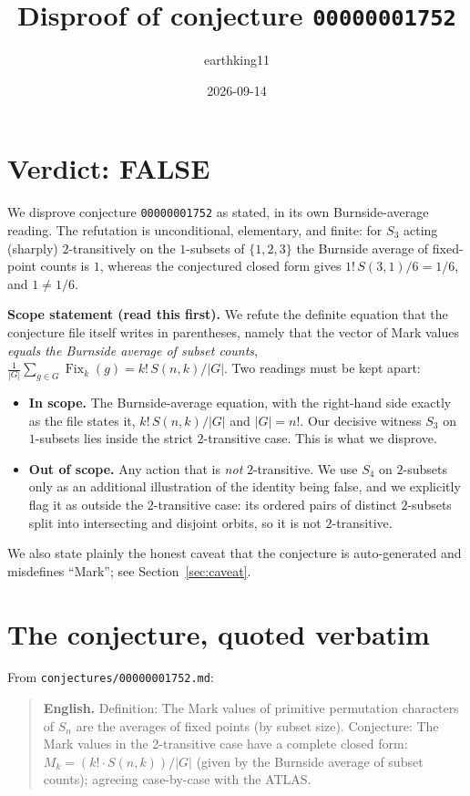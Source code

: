 \documentclass[11pt]{article}
\title{Disproof of conjecture \texttt{00000001752}}
\author{earthking11}
\date{2026-09-14}
\theoremstyle{definition}
\theoremstyle{remark}
\newcommand{\Sthree}{S_3}
\newcommand{\Fix}{\operatorname{Fix}}
\newcommand{\Stir}[2]{S(#1,#2)}
\begin{document}
\maketitle

\section*{Verdict: FALSE}

We disprove conjecture \texttt{00000001752} as stated, in its own
Burnside-average reading. The refutation is unconditional, elementary, and
finite: for $\Sthree$ acting (sharply) $2$-transitively on the $1$-subsets of
$\{1,2,3\}$ the Burnside average of fixed-point counts is $1$, whereas the
conjectured closed form gives $1!\,\Stir{3}{1}/6 = 1/6$, and $1 \ne 1/6$.

\medskip
\noindent\textbf{Scope statement (read this first).} We refute the definite
equation that the conjecture file itself writes in parentheses, namely that the
vector of Mark values \emph{equals the Burnside average of subset counts},
$\frac1{|G|}\sum_{g\in G}\Fix_k(g) = k!\,\Stir{n}{k}/|G|$. Two readings must be
kept apart:
\begin{itemize}
\item \textbf{In scope.} The Burnside-average equation, with the right-hand
  side exactly as the file states it, $k!\,\Stir{n}{k}/|G|$ and $|G|=n!$. Our
  decisive witness $\Sthree$ on $1$-subsets lies inside the strict
  $2$-transitive case. This is what we disprove.
\item \textbf{Out of scope.} Any action that is \emph{not} $2$-transitive. We
  use $S_4$ on $2$-subsets only as an additional illustration of the identity
  being false, and we explicitly flag it as outside the $2$-transitive case:
  its ordered pairs of distinct $2$-subsets split into intersecting and
  disjoint orbits, so it is not $2$-transitive.
\end{itemize}
We also state plainly the honest caveat that the conjecture is auto-generated
and misdefines ``Mark''; see Section~\ref{sec:caveat}.

\section{The conjecture, quoted verbatim}

From \texttt{conjectures/00000001752.md}:

\begin{quote}
\textbf{English.} Definition: The Mark values of primitive permutation
characters of $S_n$ are the averages of fixed points (by subset size).
Conjecture: The Mark values in the 2-transitive case have a complete closed
form: $M_k = (k!\cdot S(n,k))/|G|$ (given by the Burnside average of subset
counts); agreeing case-by-case with the ATLAS.
\end{quote}
\end{document}
